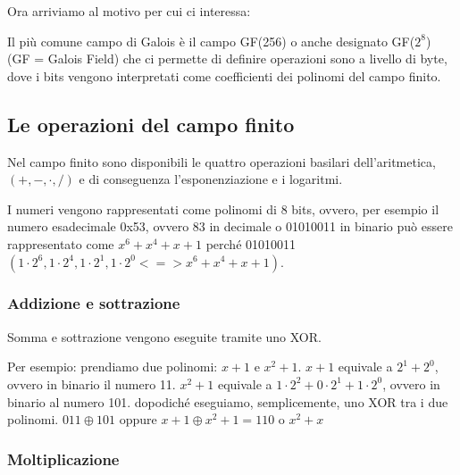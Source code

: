 \textsf{\small Ora arriviamo al motivo per cui ci interessa:} %

  

\textsf{\small Il più comune campo di Galois è il campo GF(256) o anche designato GF($2^8$) (GF = Galois Field) che ci permette di definire operazioni sono a livello di byte, dove i bits vengono interpretati come coefficienti dei polinomi del campo finito.}

\subsection{Le operazioni del campo finito}

 

\textsf{\small Nel campo finito sono disponibili le quattro operazioni basilari dell'aritmetica, $(+, -, \cdot, /)$ e di conseguenza l'esponenziazione e i logaritmi.} %

\textsf{\small I numeri vengono rappresentati come polinomi di 8 bits, ovvero, per esempio il numero esadecimale 0x53, ovvero 83 in decimale o 01010011 in binario può essere rappresentato come $x^6 + x^4 + x + 1$ perché 01010011 $(1 \cdot 2^6, 1 \cdot 2^4, 1 \cdot 2^1, 1 \cdot 2^0 <=> x^6 + x^4 + x + 1)$. }


\subsubsection{Addizione e sottrazione}

  

\textsf{\small Somma e sottrazione vengono eseguite tramite uno XOR.}

\textsf{\small Per esempio: prendiamo due polinomi: $x + 1 \text{ e } x^2 + 1$.}
\textsf{\small $x + 1$ equivale a $2^1 + 2^0$, ovvero in binario il numero 11.}
\textsf{\small $x^2 + 1$ equivale a $1 \cdot 2^2 + 0 \cdot 2^1 + 1 \cdot 2^0$, ovvero in binario al numero 101.}
\textsf{\small dopodiché eseguiamo, semplicemente, uno XOR tra i due polinomi.}
\textsf{\small  $011 \oplus 101$ oppure $x + 1 \oplus x^2 + 1 = 110 \text{ o } x^2 + x$}

\subsubsection{Moltiplicazione}

